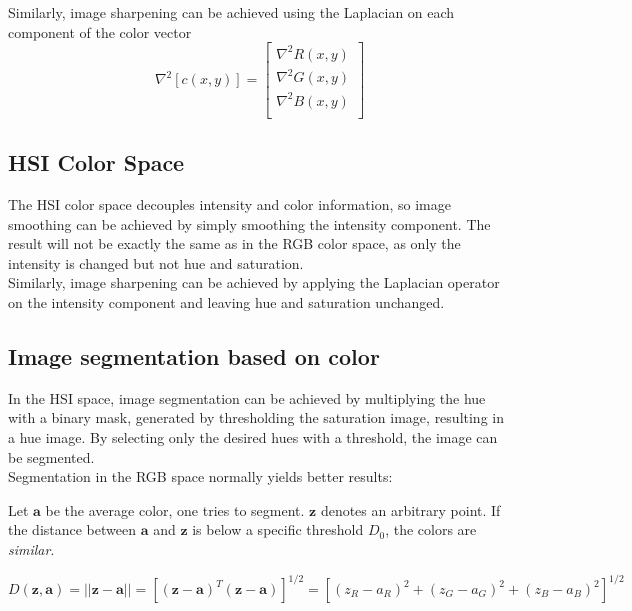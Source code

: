 Similarly, image sharpening can be achieved using the Laplacian on each component of the color vector
\begin{equation}
	\nabla^2 \left[ c(x,y) \right] = \left[ \begin{array}{l}
		\nabla^2 R(x,y) \\
		\nabla^2 G(x,y) \\
		\nabla^2 B(x,y) \\		
	\end{array} \right]
\end{equation}

\subsection{HSI Color Space}
The HSI color space decouples intensity and color information, so image smoothing can be achieved by simply smoothing the intensity component. The result will not be exactly the same as in the RGB color space, as only the intensity is changed but not hue and saturation. \\

Similarly, image sharpening can be achieved by applying the Laplacian operator on the intensity component and leaving hue and saturation unchanged.

\subsection{Image segmentation based on color }
In the HSI space, image segmentation can be achieved by multiplying the hue with a binary mask, generated by thresholding the saturation image, resulting in a hue image. By selecting only the desired hues with a threshold, the image can be segmented. \\

Segmentation in the RGB space normally yields better results:

Let $\mathbf{a}$ be the average color, one tries to segment. $\mathbf{z}$ denotes an arbitrary point. If the distance between $\mathbf{a}$ and $\mathbf{z}$ is below a specific threshold $D_0$, the colors are \textit{similar}. 

\begin{equation}
	D(\mathbf{z},\mathbf{a}) = \left|\left| \mathbf{z}-\mathbf{a} \right|\right| = \left[(\mathbf{z}-\mathbf{a})^T(\mathbf{z}-\mathbf{a})\right]^{1/2} = \left[ (z_R-a_R)^2 + (z_G-a_G)^2 + (z_B-a_B)^2 \right]^{1/2}
\end{equation}

